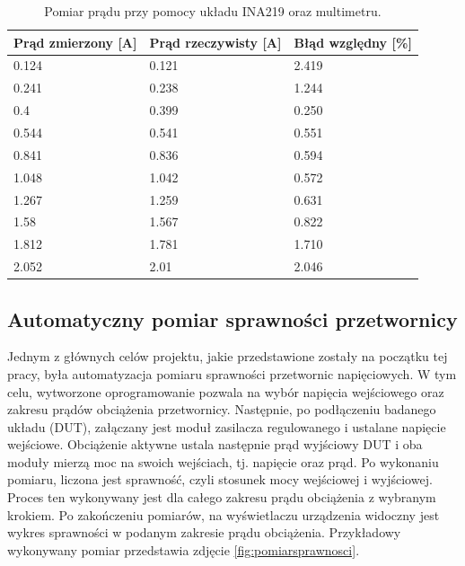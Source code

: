 \begin{table}[]
\centering
\begin{tabular}{|l|l|l|}
\hline
Prąd   zmierzony {[}A{]} & Prąd rzeczywisty   {[}A{]} & Błąd względny   {[}\%{]} \\ \hline
0.124                    & 0.121                      & 2.419              \\ \hline
0.241                    & 0.238                      & 1.244              \\ \hline
0.4                      & 0.399                      & 0.250                     \\ \hline
0.544                    & 0.541                      & 0.551              \\ \hline
0.841                    & 0.836                      & 0.594              \\ \hline
1.048                    & 1.042                      & 0.572              \\ \hline
1.267                    & 1.259                      & 0.631              \\ \hline
1.58                     & 1.567                      & 0.822               \\ \hline
1.812                    & 1.781                      & 1.710              \\ \hline
2.052                    & 2.01                       & 2.046             \\ \hline
\end{tabular}
\caption{Pomiar prądu przy pomocy układu INA219 oraz multimetru.}
\label{tab:pomiaryINA2192}
\end{table}




\subsection{Automatyczny pomiar sprawności przetwornicy}

Jednym z głównych celów projektu, jakie przedstawione zostały na początku tej pracy, była automatyzacja pomiaru sprawności 
przetwornic napięciowych. W tym celu, wytworzone oprogramowanie pozwala na wybór napięcia wejściowego oraz zakresu prądów obciążenia
przetwornicy. Następnie, po podłączeniu badanego układu (DUT), załączany jest moduł zasilacza regulowanego i ustalane napięcie wejściowe.
Obciążenie aktywne ustala następnie prąd wyjściowy DUT i oba moduły mierzą moc na swoich wejściach, tj. napięcie oraz prąd.
Po wykonaniu pomiaru, liczona jest sprawność, czyli stosunek mocy wejściowej i wyjściowej. Proces ten wykonywany jest dla
całego zakresu prądu obciążenia z wybranym krokiem. Po zakończeniu pomiarów, na wyświetlaczu urządzenia widoczny jest wykres
sprawności w podanym zakresie prądu obciążenia. Przykładowy wykonywany pomiar przedstawia zdjęcie \ref{fig:pomiarsprawnosci}.

